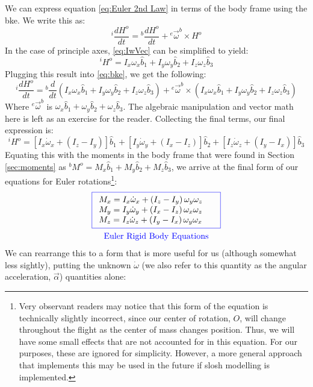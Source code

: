 \documentclass[12pt]{report}
\begin{document}
We can express equation \eqref{eq:Euler 2nd Law} in terms of the \gls{body frame} using the \gls{bke}. We write this as:
\begin{equation}\label{eq:bke}
{}^i\frac{dH^o}{dt}={}^b\frac{dH^o}{dt}+{}^e\vec{\omega}^b\times H^o
\end{equation}
In the case of \gls{principle axes}, \eqref{eq:IwVec} can be simplified to yield:
$${}^iH^o=I_x\omega_x\hat{b}_1+I_y\omega_y\hat{b}_2+I_z\omega_z\hat{b}_3$$
Plugging this result into \eqref{eq:bke}, we get the following:
$${}^i\frac{dH^o}{dt}={}^b\frac{d}{dt}\left(I_x\omega_x\hat{b}_1+I_y\omega_y\hat{b}_2+I_z\omega_z\hat{b}_3\right)+{}^e\vec{\omega}^b\times \left(I_x\omega_x\hat{b}_1+I_y\omega_y\hat{b}_2+I_z\omega_z\hat{b}_3\right)$$
Where ${}^e\vec{\omega}^b$ is $\omega_x\hat{b}_1+\omega_y\hat{b}_2+\omega_z\hat{b}_3$. The algebraic manipulation and vector math here is left as an exercise for the reader. Collecting the final terms, our final expression is:
$${}^iH^o=\left[I_x\dot{\omega}_x+\left(I_z-I_y\right)\right]\hat{b}_1+\left[I_y\dot{\omega}_y+\left(I_x-I_z\right)\right]\hat{b}_2+\left[I_z\dot{\omega}_z+\left(I_y-I_x\right)\right]\hat{b}_3$$
Equating this with the moments in the \gls{body frame} that were found in Section \ref{sec:moments} as ${}^bM^o=M_x\hat{b}_1+M_y\hat{b}_2+M_z\hat{b}_3$, we arrive at the final form of our equations for Euler rotations\footnote{Very observant readers may notice that this form of the equation is technically slightly incorrect, since our center of rotation, $O$, will change throughout the flight as the center of mass changes position. Thus, we will have some small effects that are not accounted for in this equation. For our purposes, these are ignored for simplicity. However, a more general approach that implements this may be used in the future if slosh modelling is implemented.}:
\begin{gather}\label{eq: moment equations}
\color{blue}\boxed{\color{black}\begin{array}{ll}
     M_x=I_x\dot{\omega}_x+\left(I_z-I_y\right)\omega_y\omega_z
     & \\M_y=I_y\dot{\omega}_y+\left(I_x-I_z\right)\omega_x\omega_z\
     &\\ M_z=I_z\dot{\omega}_z+\left(I_y-I_x\right)\omega_y\omega_x
\end{array}}
\\\mathrm{\color{blue}Euler \ Rigid \ Body \ Equations}
\end{gather}
We can rearrange this to a form that is more useful for us (although somewhat less sightly), putting the unknown $\dot\omega$ (we also refer to this quantity as the angular acceleration, $\vec{\alpha}$) quantities alone:
\end{document}
